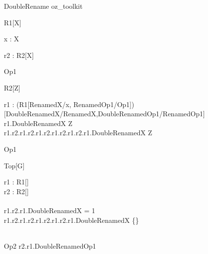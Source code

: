 \begin{zsection}
  \SECTION DoubleRename \parents oz\_toolkit
\end{zsection}

\begin{class}{R1[X]}
  \begin{axdef}
    x : X
  \end{axdef}
  \begin{state}
    r2 : R2[X]
  \end{state}
  Op1 \sdef [x? : \nat]
\end{class}

\begin{class}{R2[Z]}
  \begin{state}
   r1 : (R1[RenamedX/x, RenamedOp1/Op1])[DoubleRenamedX/RenamedX,DoubleRenamedOp1/RenamedOp1]
  \where
    r1.DoubleRenamedX \in Z\\
    r1.r2.r1.r2.r1.r2.r1.r2.r1.r2.r1.DoubleRenamedX \in Z
  \end{state}
  Op1 \sdef [x? : \nat]
\end{class}

\begin{class}{Top[G]}
  \begin{state}
    r1 : R1[\nat]\\
    r2 : R2[\power\power\nat]\\
  \where\\
   r1.r2.r1.DoubleRenamedX = 1\\
   r1.r2.r1.r2.r1.r2.r1.r2.r1.DoubleRenamedX \in \{\}\\
  \end{state}\\
  Op2 \sdef %
r2.r1.DoubleRenamedOp1
\end{class}

